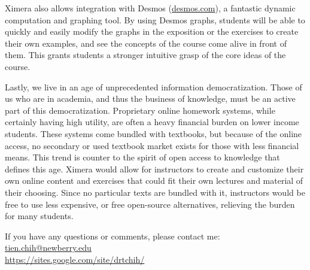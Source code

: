 \documentclass{ximera}
\begin{document}
Ximera also allows integration with Desmos (\url{desmos.com}), a fantastic dynamic computation and graphing tool.  By using Desmos graphs, students will be able to quickly and easily modify the graphs in the exposition or the exercises to create their own examples, and see the concepts of the course come alive in front of them.  This grants students a stronger intuitive grasp of the core ideas of the course.

Lastly, we live  in an age of unprecedented information democratization.  Those of us who are in academia, and thus the business of knowledge, must be an active part of this democratization.  Proprietary online homework systems, while certainly having high utility,  are often a heavy financial burden on lower income students.  These systems come bundled with textbooks, but because of the online access, no secondary or used textbook market exists for those with less financial means.  This trend is counter to the spirit of open access to knowledge that defines this age.  Ximera would allow for instructors to create and customize their own online content and exercises that could fit their own lectures and material of their choosing.  Since no particular texts are bundled with it, instructors would be free to use less expensive, or free open-source alternatives, relieving the burden for many students.


If you have any questions or comments, please contact me:\\
\href{mailto:tien.chih@newberry.edu}{tien.chih@newberry.edu}\\
\url{https://sites.google.com/site/drtchih/}
\end{document}
